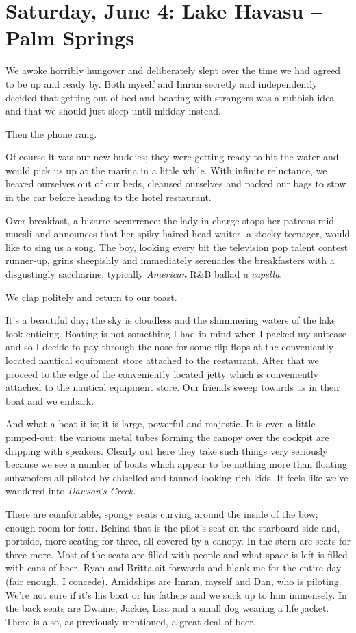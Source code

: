 \documentclass[a5paper,titlepage,draft]{book}
\begin{document}
\chapter[Lake Havasu -- Palm Springs]{Saturday, June 4:  Lake Havasu -- Palm Springs}
We awoke horribly hungover and deliberately slept over the time we had agreed to be up and ready by.  Both myself and Imran secretly and independently decided that getting out of bed and boating with strangers was a rubbish idea and that we should just sleep until midday instead.

Then the phone rang.

Of course it was our new buddies; they were getting ready to hit the water and would pick us up at the marina in a little while.  With infinite reluctance, we heaved ourselves out of our beds, cleansed ourselves and packed our bags to stow in the car before heading to the hotel restaurant.

Over breakfast, a bizarre occurrence:  the lady in charge stops her patrons mid-muesli and announces that her spiky-haired head waiter, a stocky teenager, would like to sing us a song.  The boy, looking every bit the television pop talent contest runner-up, grins sheepishly and immediately serenades the breakfasters with a disgustingly saccharine, typically \emph{American} R\&B ballad \emph{a capella}.

We clap politely and return to our toast.

It's a beautiful day; the sky is cloudless and the shimmering waters of the lake look enticing.  Boating is not something I had in mind when I packed my suitcase and so I decide to pay through the nose for some flip-flops at the conveniently located nautical equipment store attached to the restaurant.  After that we proceed to the edge of the conveniently located jetty which is conveniently attached to the nautical equipment store.  Our friends sweep towards us in their boat and we embark.

And what a boat it is; it is large, powerful and majestic.  It is even a little pimped-out; the various metal tubes forming the canopy over the cockpit are dripping with speakers.  Clearly out here they take such things very seriously because we see a number of boats which appear to be nothing more than floating subwoofers all piloted by chiselled and tanned looking rich kids.  It feels like we've wandered into \emph{Dawson's Creek}.

There are comfortable, spongy seats curving around the inside of the bow; enough room for four.  Behind that is the pilot's seat on the starboard side and, portside, more seating for three, all covered by a canopy.  In the stern are seats for three more.  Most of the seats are filled with people and what space is left is filled with cans of beer.  Ryan and Britta sit forwards and blank me for the entire day (fair enough, I concede).  Amidships are Imran, myself and Dan, who is piloting.  We're not sure if it's his boat or his fathers and we suck up to him immensely.  In the back seats are Dwaine, Jackie, Lisa and a small dog wearing a life jacket.  There is also, as previously mentioned, a great deal of beer.
\end{document}
